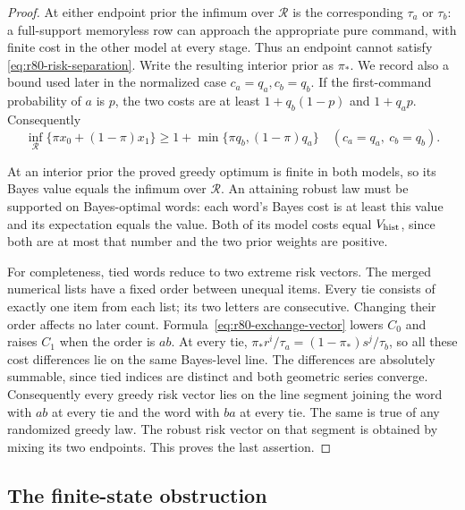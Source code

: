 \begin{proof}
At either endpoint prior the infimum over $\mathcal R$ is the
corresponding $\tau_a$ or $\tau_b$: a full-support memoryless row
can approach the appropriate pure command, with finite cost in
the other model at every stage.  Thus an endpoint cannot satisfy
\eqref{eq:r80-risk-separation}.  Write the resulting interior
prior as $\pi_*$.  We record also a bound used later in the
normalized case $c_a=q_a,c_b=q_b$.  If the first-command
probability of $a$ is $p$, the two costs are at least
$1+q_b(1-p)$ and $1+q_ap$.  Consequently
\begin{equation}\label{eq:r80-bayes-first-call}
 \inf_{\mathcal R}\{\pi x_0+(1-\pi)x_1\}
 \ge 1+\min\{\pi q_b,(1-\pi)q_a\}
 \quad(c_a=q_a,\ c_b=q_b).
\end{equation}

At an interior prior the proved greedy optimum is finite in both
models, so its Bayes value equals the infimum over $\mathcal R$.
An attaining robust law must be supported on Bayes-optimal words:
each word's Bayes cost is at least this value and its expectation
equals the value.  Both of its model costs equal
$V_{\rm hist}$, since both are at most that number and the two
prior weights are positive.

For completeness, tied words reduce to two extreme risk vectors.
The merged numerical lists have a fixed order between unequal
items.  Every tie consists of exactly one item from each list;
its two letters are consecutive.  Changing their order affects
no later count.  Formula~\eqref{eq:r80-exchange-vector} lowers
$C_0$ and raises $C_1$ when the order is $ab$.  At every tie,
$\pi_*r^i/\tau_a=(1-\pi_*)s^j/\tau_b$, so all these cost differences lie on
the same Bayes-level line.  The differences are absolutely
summable, since tied indices are distinct and both geometric
series converge.  Consequently every greedy risk vector lies
on the line segment joining the word with $ab$ at every tie
and the word with $ba$ at every tie.  The same is true of any
randomized greedy law.  The robust risk vector on that segment
is obtained by mixing its two endpoints.  This proves the last
assertion.
\end{proof}

\subsection{The finite-state obstruction}


